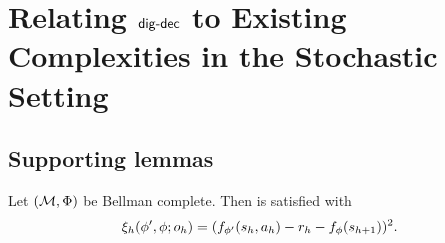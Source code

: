 \newpage

\section{Relating $\mathsf{dig}\text{-}\mathsf{dec}$ to Existing Complexities in the Stochastic Setting}


\subsection{Supporting lemmas}
\iffalse
\begin{lemma}\label{lem: bellman com}
   Let $(\mathcal{M}, \Phi)$ be Bellman complete. Then  is satisfied with 
   \begin{align*}
       \xi_h(\phi', \phi; o_h) = (f_{\phi'}(s_h,a_h) - r_h - f_{\phi}(s_{h+1}))^2. 
   \end{align*}
\end{lemma}

